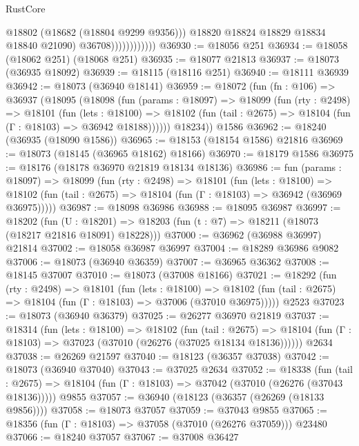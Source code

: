 \begin{lexlean}{RustCore}
\begin{coremodule}
                                @18802
                                (@18682 (@18804 @9299 @9356)))
                              @18820
                              @18824
                              @18829
                              @18834
                              @18840
                              @21090)
                            @36708))))))))))))
@36930 := @18056 @251
@36934 := @18058 (@18062 @251) (@18068 @251)
@36935 := @18077 @21813
@36937 := @18073 (@36935 @18092)
@36939 := @18115 (@18116 @251)
@36940 := @18111 @36939
@36942 := @18073 (@36940 @18141)
@36959 := @18072
    (fun (fn : @106) =>
    @36937
      (@18095
        (@18098
          (fun (params : @18097) =>
          @18099
            (fun (rty : @2498) =>
            @18101
              (fun (lets : @18100) =>
              @18102 (fun (tail : @2675) => @18104 (fun (Γ : @18103) => @36942 @18188))))))
        @18234))
    @1586
@36962 := @18240 (@36935 (@18090 @1586))
@36965 := @18153 (@18154 @1586) @21816
@36969 := @18073 (@18145 (@36965 @18162) @18166)
@36970 := @18179 @1586
@36975 := @18176 (@18178 @36970 @21819 @18134 @18136)
@36986 := fun (params : @18097) =>
  @18099
    (fun (rty : @2498) =>
    @18101
      (fun (lets : @18100) =>
      @18102 (fun (tail : @2675) => @18104 (fun (Γ : @18103) => @36942 (@36969 @36975)))))
@36987 := @18098 @36986
@36988 := @18095 @36987
@36997 := @18202
    (fun (U : @18201) => @18203 (fun (t : @7) => @18211 (@18073 (@18217 @21816 @18091) @18228)))
@37000 := @36962 (@36988 @36997) @21814
@37002 := @18058 @36987 @36997
@37004 := @18289 @36986 @9082
@37006 := @18073 (@36940 @36359)
@37007 := @36965 @36362
@37008 := @18145 @37007
@37010 := @18073 (@37008 @18166)
@37021 := @18292
    (fun (rty : @2498) =>
    @18101
      (fun (lets : @18100) =>
      @18102 (fun (tail : @2675) => @18104 (fun (Γ : @18103) => @37006 (@37010 @36975)))))
    @2523
@37023 := @18073 (@36940 @36379)
@37025 := @26277 @36970 @21819
@37037 := @18314
    (fun (lets : @18100) =>
    @18102
      (fun (tail : @2675) =>
      @18104 (fun (Γ : @18103) => @37023 (@37010 (@26276 (@37025 @18134 @18136))))))
    @2634
@37038 := @26269 @21597
@37040 := @18123 (@36357 @37038)
@37042 := @18073 (@36940 @37040)
@37043 := @37025 @2634
@37052 := @18338
    (fun (tail : @2675) => @18104 (fun (Γ : @18103) => @37042 (@37010 (@26276 (@37043 @18136)))))
    @9855
@37057 := @36940 (@18123 (@36357 (@26269 (@18133 @9856))))
@37058 := @18073 @37057
@37059 := @37043 @9855
@37065 := @18356 (fun (Γ : @18103) => @37058 (@37010 (@26276 @37059))) @23480
@37066 := @18240 @37057
@37067 := @37008 @36427

\end{coremodule}
\end{lexlean}
